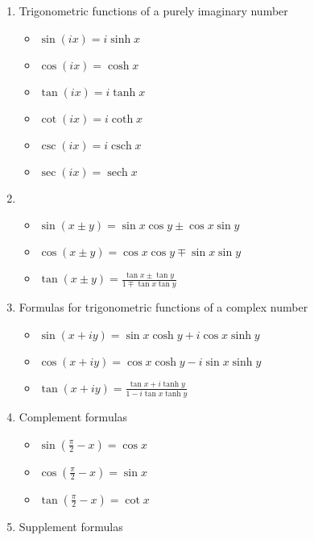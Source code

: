 \documentclass[12pt]{article}
\theoremstyle{definition}
\begin{document}
\begin{enumerate}
\item Trigonometric functions of a purely imaginary number

\begin{itemize}
\item $\sin(ix)=i\sinh x$
\item $\cos(ix)=\cosh x$
\item $\tan(ix)=i\tanh x$
\item $\cot(ix)=i\coth x$
\item $\csc(ix)=i\operatorname{csch}x$
\item $\sec(ix)=\operatorname{sech}x$
\end{itemize}

\item {}

\begin{itemize}
\item $\sin(x \pm y) = \sin{x}\cos{y}\pm\cos{x}\sin{y}$
\item $\cos(x \pm y) = \cos{x}\cos{y}\mp\sin{x}\sin{y}$
\item $\displaystyle \tan(x \pm y) = \frac{\tan{x}\pm\tan{y}}{1\mp\tan{x}\tan{y}}$
\end{itemize}

\item Formulas for trigonometric functions of a complex number

\begin{itemize}
\item $\sin(x+iy) = \sin x\cosh y+i\cos x\sinh y$
\item $\cos(x+iy) = \cos x\cosh y-i\sin x\sinh y$
\item $\displaystyle \tan(x+iy) = \frac{\tan x+i\tanh y}{1-i\tan x\tanh y}$
\end{itemize}

\item Complement formulas

\begin{itemize}
\item $\displaystyle \sin\left(\frac{\pi}{2}-x\right) = \cos{x}$
\item $\displaystyle \cos\left(\frac{\pi}{2}-x\right) = \sin{x}$
\item $\displaystyle \tan\left(\frac{\pi}{2}-x\right) = \cot{x}$
\end{itemize}

\item Supplement formulas


\end{enumerate}
\end{document}
